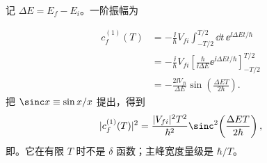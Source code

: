 \begin{derivation}
记 $\Delta E=E_f-E_i$。一阶振幅为

\begin{align*}
 c_f^{(1)}(T)
 &=-\frac{\ii}{\hbar}V_{fi}
 \int_{-T/2}^{T/2}\dd t\,\ee^{\ii\Delta E t/\hbar}\\
 &=-\frac{\ii}{\hbar}V_{fi}
 \left[\frac{\hbar}{\ii\Delta E}
 \ee^{\ii\Delta E t/\hbar}\right]_{-T/2}^{T/2}\\
 &=-\frac{2\ii V_{fi}}{\Delta E}
 \sin\!\left(\frac{\Delta E T}{2\hbar}\right).
\end{align*}
把 $\sinc x\equiv\sin x/x$ 提出，得到
\begin{equation*}
 |c_f^{(1)}(T)|^2
 =\frac{|V_{fi}|^2T^2}{\hbar^2}
 \sinc^2\!\left(\frac{\Delta E T}{2\hbar}\right),
\end{equation*}
即。它在有限 $T$ 时不是 $\delta$ 函数；主峰宽度量级是 $\hbar/T$。


\end{derivation}

